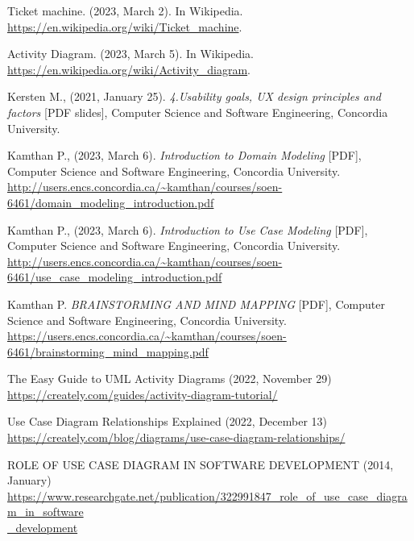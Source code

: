 \documentclass[letterpaper]{report}
\begin{document}
\begin{thebibliography}{9}
Ticket machine. (2023, March 2). In Wikipedia.\\
\url{https://en.wikipedia.org/wiki/Ticket\_machine}.

Activity Diagram. (2023, March 5). In Wikipedia.\\
\url{https://en.wikipedia.org/wiki/Activity\_diagram}.

Kersten M., (2021, January 25). \textit{4.Usability goals, UX design principles and factors} [PDF slides], Computer Science and Software Engineering, Concordia University.

Kamthan P., (2023, March 6). \textit{Introduction to Domain Modeling} [PDF], Computer Science and Software Engineering, Concordia University. \url{http://users.encs.concordia.ca/~kamthan/courses/soen-6461/domain_modeling_introduction.pdf}

Kamthan P., (2023, March 6). \textit{Introduction to Use Case Modeling} [PDF], Computer Science and Software Engineering, Concordia University. \url{http://users.encs.concordia.ca/~kamthan/courses/soen-6461/use_case_modeling_introduction.pdf}

Kamthan P. \textit{BRAINSTORMING AND MIND MAPPING} [PDF], Computer Science and Software Engineering, Concordia University. \url{https://users.encs.concordia.ca/~kamthan/courses/soen-6461/brainstorming_mind_mapping.pdf}

The Easy Guide to UML Activity Diagrams (2022, November 29)
\url{https://creately.com/guides/activity-diagram-tutorial/}

Use Case Diagram Relationships Explained (2022, December 13)
\url{https://creately.com/blog/diagrams/use-case-diagram-relationships/}

ROLE OF USE CASE DIAGRAM IN SOFTWARE DEVELOPMENT (2014, January)
\href{https://www.researchgate.net/publication/322991847_role_of_use_case_diagram_in_software_development}{https://www.researchgate.net/publication/322991847\_role\_of\_use\_case\_diagram\_in\_software\\
\_development}      %


\end{thebibliography}
\end{document}
